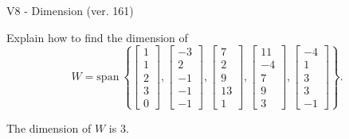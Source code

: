 \begin{exercise}
  \begin{exerciseTitle}V8 - Dimension (ver. 161)\end{exerciseTitle}
  \begin{exerciseStatement}
    Explain how to find the dimension of 
\[W=\mathrm{span}\ \left\{\left[\begin{array}{r}
1 \\
1 \\
2 \\
3 \\
0
\end{array}\right] , \left[\begin{array}{r}
-3 \\
2 \\
-1 \\
-1 \\
-1
\end{array}\right] , \left[\begin{array}{r}
7 \\
2 \\
9 \\
13 \\
1
\end{array}\right] , \left[\begin{array}{r}
11 \\
-4 \\
7 \\
9 \\
3
\end{array}\right] , \left[\begin{array}{r}
-4 \\
1 \\
3 \\
3 \\
-1
\end{array}\right]\right\}.\]



  \end{exerciseStatement}
  \begin{exerciseAnswer}
   The dimension of \(W\) is  \(3\).
  


  \end{exerciseAnswer}
\end{exercise}